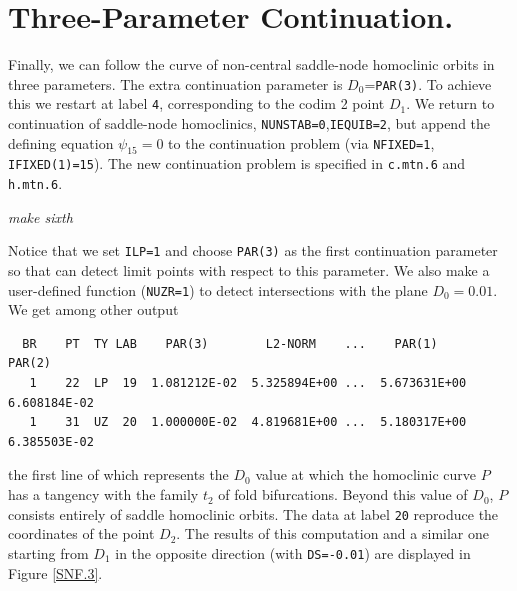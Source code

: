 \documentclass[12pt]{report}
\begin{document}
\section{Three-Parameter Continuation.}
Finally, we can follow the curve of non-central saddle-node homoclinic
orbits in three parameters. The extra continuation parameter is
$D_0$={\tt PAR(3)}.  To achieve this we restart at label {\tt 4},
corresponding to the codim 2 point $D_1$. We return to continuation of
saddle-node homoclinics, {\tt NUNSTAB=0},{\tt IEQUIB=2}, but append the
defining equation $\psi_{15}=0$ to the continuation problem
(via {\tt NFIXED=1}, {\tt IFIXED(1)=15}). The new
continuation problem is specified in {\tt c.mtn.6} and {\tt h.mtn.6}.
\begin{center}
{\it make sixth}
\end{center}
Notice that we set {\tt ILP=1} and choose {\tt PAR(3)} as the first 
continuation parameter so that \AUTO can detect limit points 
with respect to this parameter. We also make a user-defined function
({\tt NUZR=1})
to detect intersections with the plane $D_0=0.01$.
We get among other output
\begin{verbatim}
  BR    PT  TY LAB    PAR(3)        L2-NORM    ...    PAR(1)        PAR(2)
   1    22  LP  19  1.081212E-02  5.325894E+00 ...  5.673631E+00  6.608184E-02
   1    31  UZ  20  1.000000E-02  4.819681E+00 ...  5.180317E+00  6.385503E-02
\end{verbatim}
the first line of which represents the $D_0$ value at which 
the homoclinic curve $P$ has a tangency with the family $t_2$ 
of fold bifurcations. Beyond this value of $D_0$,
$P$ consists entirely of saddle homoclinic orbits. The data at label {\tt 20} 
reproduce the coordinates of the point $D_2$. The results of this
computation and a similar one starting from $D_1$ in the opposite direction
(with {\tt DS=-0.01}) are displayed in Figure \ref{SNF.3}.
%

\newpage
\end{document}
